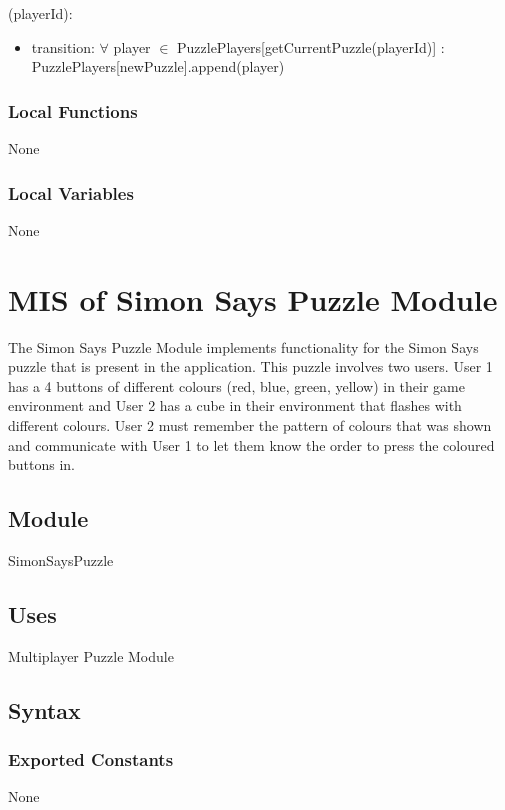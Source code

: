 \documentclass[12pt, titlepage]{article}
\begin{document}
(playerId):
\begin{itemize}
\item transition: $\forall$ player $\in$ PuzzlePlayers[getCurrentPuzzle(playerId)] : \newline PuzzlePlayers[newPuzzle].append(player)
\end{itemize}

\subsubsection{Local Functions}

None

\subsubsection{Local Variables}

None

\newpage

\section{MIS of Simon Says Puzzle Module} \label{sec:Simon}

\noindent The Simon Says Puzzle Module implements functionality for the Simon Says puzzle that is present in the application. This puzzle involves two users. User 1 has a 4 buttons of different colours (red, blue, green, yellow) in their game environment and User 2 has a cube in their environment that flashes with different colours. User 2 must remember the pattern of colours that was shown and communicate with User 1 to let them know the order to press the coloured buttons in.

\subsection{Module}
SimonSaysPuzzle

\subsection{Uses}
Multiplayer Puzzle Module

\subsection{Syntax}

\subsubsection{Exported Constants}
None
\end{document}
